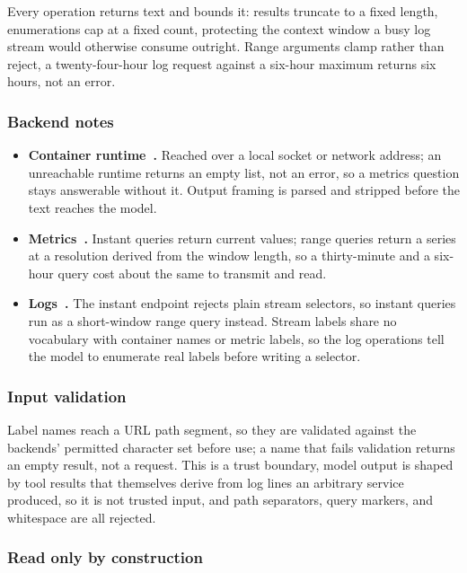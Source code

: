 \documentclass[11pt,a4paper]{article}
\begin{document}
Every operation returns text and bounds it: results truncate to a fixed length,
enumerations cap at a fixed count, protecting the context window a busy log stream
would otherwise consume outright. Range arguments clamp rather than reject, a
twenty-four-hour log request against a six-hour maximum returns six hours, not an
error.

\subsubsection{Backend notes}

\begin{itemize}
  \item \textbf{Container runtime~\cite{dockerapi}.} Reached over a local socket or
        network address; an unreachable runtime returns an empty list, not an error,
        so a metrics question stays answerable without it. Output framing is parsed
        and stripped before the text reaches the model.
  \item \textbf{Metrics~\cite{promapi,promql}.} Instant queries return current
        values; range queries return a series at a resolution derived from the
        window length, so a thirty-minute and a six-hour query cost about the same
        to transmit and read.
  \item \textbf{Logs~\cite{lokiapi,logql}.} The instant endpoint rejects plain stream
        selectors, so instant queries run as a short-window range query instead.
        Stream labels share no vocabulary with container names or metric labels, so
        the log operations tell the model to enumerate real labels before writing a
        selector.
\end{itemize}

\subsubsection{Input validation}

Label names reach a URL path segment, so they are validated against the backends'
permitted character set before use; a name that fails validation returns an empty
result, not a request. This is a trust boundary, model output is shaped by tool
results that themselves derive from log lines an arbitrary service produced, so it
is not trusted input, and path separators, query markers, and whitespace are all
rejected.

\subsubsection{Read only by construction}
\label{sec:readonly}
\end{document}
